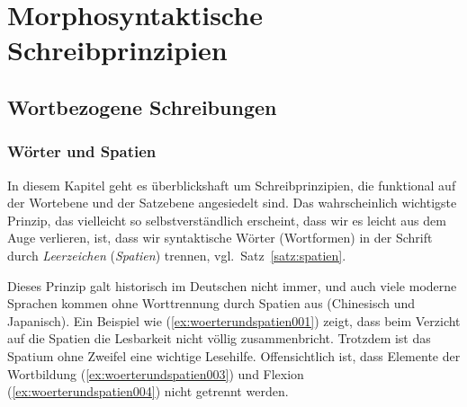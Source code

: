 \chapter{Morphosyntaktische Schreibprinzipien}
\label{sec:morphosyntaktischeschreibprinzipien}

\section{Wortbezogene Schreibungen}
\label{sec:wortbezogeneschreibungen}

\subsection{Wörter und Spatien}
\label{sec:woerterundspatien}


In diesem Kapitel geht es überblickshaft um Schreibprinzipien, die funktional auf der Wortebene und der Satzebene angesiedelt sind.
Das wahrscheinlich wichtigste Prinzip, das vielleicht so selbstverständlich erscheint, dass wir es leicht aus dem Auge verlieren, ist, dass wir syntaktische Wörter (Wortformen) in der Schrift durch \textit{Leerzeichen} (\textit{Spatien}) trennen, vgl.\ Satz~\ref{satz:spatien}.


Dieses Prinzip galt historisch im Deutschen nicht immer, und auch viele moderne Sprachen kommen ohne Worttrennung durch Spatien aus (\zB Chinesisch und Japanisch).
Ein Beispiel wie (\ref{ex:woerterundspatien001}) zeigt, dass beim Verzicht auf die Spatien die Lesbarkeit nicht völlig zusammenbricht.
Trotzdem ist das Spatium ohne Zweifel eine wichtige Lesehilfe.
Offensichtlich ist, dass Elemente der Wortbildung (\ref{ex:woerterundspatien003}) und Flexion (\ref{ex:woerterundspatien004}) nicht getrennt werden.

\begin{exe}
  \ex\label{ex:woerterundspatien002}
  \begin{xlist}
  \end{xlist}
\end{exe}

